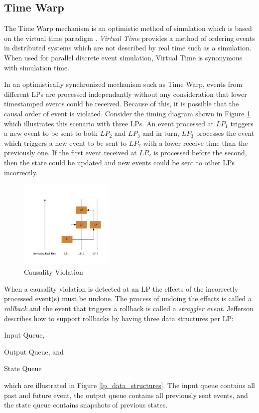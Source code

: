 \documentclass[11pt]{book}
\begin{document}
\subsection{Time Warp}

The Time Warp mechanism is an optimistic method of simulation which is based on the virtual time
paradigm \cite{jefferson-85}.  \emph{Virtual Time} provides a method of ordering events in
distributed systems which are not described by real time such as a simulation.  When used for
parallel discrete event simulation, Virtual Time is synonymous with simulation time.

In an optimistically synchronized mechanism such as Time Warp, events from different LPs are
processed independantly without any consideration that lower timestamped events could be received.
Because of this, it is possible that the causal order of event is violated.  Consider the timing
diagram shown in Figure \ref{causality_violation} which illustrates this scenario with three LPs. An
event processed at $LP_1$ triggers a new event to be sent to both $LP_2$ and $LP_3$ and in turn,
$LP_3$ processes the event which triggers a new event to be sent to $LP_2$ with a lower receive time
than the previously one. If the first event received at $LP_2$ is processed before the second, then
the state could be updated and new events could be sent to other LPs incorrectly.

\begin{figure}
    \centering
    \includegraphics[width=0.4\textwidth,quiet]{figs/graphviz/causality.pdf}
    \caption{Causality Violation}\label{causality_violation}
\end{figure}

When a causality violation is detected at an LP the effects of the incorrectly processed event(s)
must be undone. The process of undoing the effects is called a \emph{rollback} and the event that
triggers a rollback is called a \emph{straggler event}. Jefferson \cite{jefferson-85} describes how
to support rollbacks by having three data structures per LP:
\begin{inparaenum}[(1)] \item Input Queue, \item Output Queue, and \item State Queue
\end{inparaenum} which are illustrated in Figure \ref{lp_data_structures}. The input queue
contains all past and future event, the output queue contains all previously sent events, and
the state queue contains snapshots of previous states.
\end{document}
